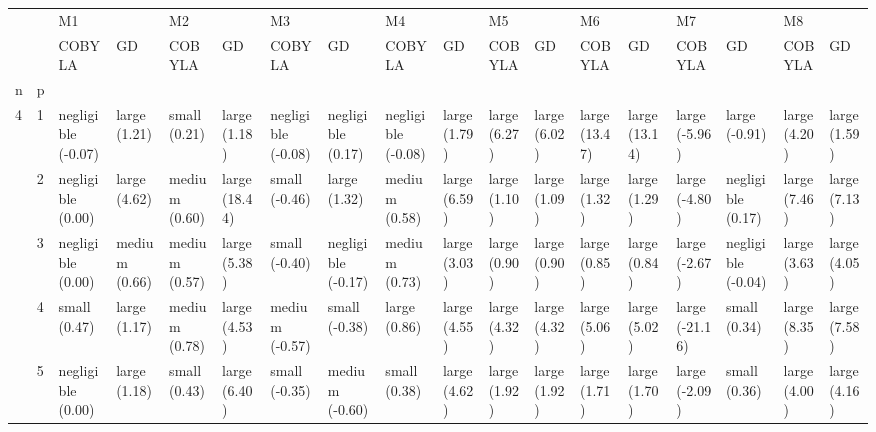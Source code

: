 \begin{tabular}{llllllllllllllllll}
\toprule
  &   & \multicolumn{2}{l}{M1} & \multicolumn{2}{l}{M2} & \multicolumn{2}{l}{M3} & \multicolumn{2}{l}{M4} & \multicolumn{2}{l}{M5} & \multicolumn{2}{l}{M6} & \multicolumn{2}{l}{M7} & \multicolumn{2}{l}{M8} \\
  &   &              COBYLA &             GD &              COBYLA &             GD &              COBYLA &                  GD &              COBYLA &            GD &        COBYLA &            GD &         COBYLA &             GD &          COBYLA &                  GD &        COBYLA &            GD \\
n & p &                     &                &                     &                &                     &                     &                     &               &               &               &                &                &                 &                     &               &               \\
\midrule
4 & 1 &  negligible (-0.07) &   large (1.21) &        small (0.21) &   large (1.18) &  negligible (-0.08) &   negligible (0.17) &  negligible (-0.08) &  large (1.79) &  large (6.27) &  large (6.02) &  large (13.47) &  large (13.14) &   large (-5.96) &       large (-0.91) &  large (4.20) &  large (1.59) \\
  & 2 &   negligible (0.00) &   large (4.62) &       medium (0.60) &  large (18.44) &       small (-0.46) &        large (1.32) &       medium (0.58) &  large (6.59) &  large (1.10) &  large (1.09) &   large (1.32) &   large (1.29) &   large (-4.80) &   negligible (0.17) &  large (7.46) &  large (7.13) \\
  & 3 &   negligible (0.00) &  medium (0.66) &       medium (0.57) &   large (5.38) &       small (-0.40) &  negligible (-0.17) &       medium (0.73) &  large (3.03) &  large (0.90) &  large (0.90) &   large (0.85) &   large (0.84) &   large (-2.67) &  negligible (-0.04) &  large (3.63) &  large (4.05) \\
  & 4 &        small (0.47) &   large (1.17) &       medium (0.78) &   large (4.53) &      medium (-0.57) &       small (-0.38) &        large (0.86) &  large (4.55) &  large (4.32) &  large (4.32) &   large (5.06) &   large (5.02) &  large (-21.16) &        small (0.34) &  large (8.35) &  large (7.58) \\
  & 5 &   negligible (0.00) &   large (1.18) &        small (0.43) &   large (6.40) &       small (-0.35) &      medium (-0.60) &        small (0.38) &  large (4.62) &  large (1.92) &  large (1.92) &   large (1.71) &   large (1.70) &   large (-2.09) &        small (0.36) &  large (4.00) &  large (4.16) \\

\end{tabular}
